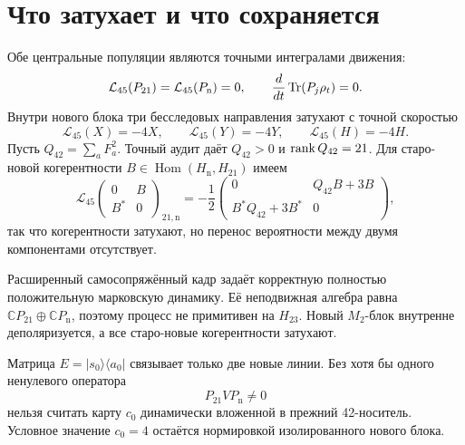 \section{Что затухает и что сохраняется}

Обе центральные популяции являются точными интегралами движения:
\begin{equation}
 \mathcal L_{45}(P_{21})=\mathcal L_{45}(P_{\mathrm n})=0,
 \qquad
 \frac{d}{dt}\operatorname{Tr}(P_j\rho_t)=0.
 \label{eq:v8-baryon-c0-l45-sector-populations-fixed}
\end{equation}
Внутри нового блока три бесследовых направления затухают с точной скоростью
\begin{equation}
 \mathcal L_{45}(X)=-4X,
 \qquad \mathcal L_{45}(Y)=-4Y,
 \qquad \mathcal L_{45}(H)=-4H.
 \label{eq:v8-baryon-c0-new-block-depolarizing-rate}
\end{equation}
Пусть $Q_{42}=\sum_aF_a^2$. Точный аудит даёт
$Q_{42}>0$ и $\operatorname{rank} Q_{42}=21$. Для старо-новой когерентности
$B\in\operatorname{Hom}(H_{\mathrm n},H_{21})$ имеем
\begin{equation}
 \mathcal L_{45}\!\begin{pmatrix}0&B\\B^*&0\end{pmatrix}_{21,\mathrm n}
 =-\frac12
 \begin{pmatrix}
 0&Q_{42}B+3B\\B^*Q_{42}+3B^*&0
 \end{pmatrix},
 \label{eq:v8-baryon-c0-old-new-coherence-decay}
\end{equation}
так что когерентности затухают, но перенос вероятности между двумя
компонентами отсутствует.

\begin{theorem}
Расширенный самосопряжённый кадр задаёт корректную полностью положительную
марковскую динамику. Её неподвижная алгебра равна
$\mathbb C P_{21}\oplus\mathbb C P_{\mathrm n}$, поэтому процесс не
примитивен на $H_{23}$. Новый $M_2$-блок внутренне деполяризуется, а все
старо-новые когерентности затухают.
\end{theorem}

\begin{nogocriterion}
Матрица $E=|s_0\rangle\langle a_0|$ связывает только две новые линии.
Без хотя бы одного ненулевого оператора
\begin{equation}
 P_{21}VP_{\mathrm n}\ne0
 \label{eq:v8-baryon-c0-required-old-new-connector}
\end{equation}
нельзя считать карту $c_0$ динамически вложенной в прежний 42-носитель.
Условное значение $c_0=4$ остаётся нормировкой изолированного нового блока.
\end{nogocriterion}


